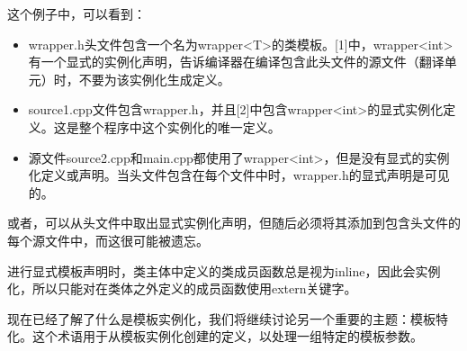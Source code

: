 这个例子中，可以看到：

\begin{itemize}
\item 
wrapper.h头文件包含一个名为wrapper<T>的类模板。[1]中，wrapper<int>有一个显式的实例化声明，告诉编译器在编译包含此头文件的源文件（翻译单元）时，不要为该实例化生成定义。

\item 
source1.cpp文件包含wrapper.h，并且[2]中包含wrapper<int>的显式实例化定义。这是整个程序中这个实例化的唯一定义。

\item 
源文件source2.cpp和main.cpp都使用了wrapper<int>，但是没有显式的实例化定义或声明。当头文件包含在每个文件中时，wrapper.h的显式声明是可见的。
\end{itemize}

或者，可以从头文件中取出显式实例化声明，但随后必须将其添加到包含头文件的每个源文件中，而这很可能被遗忘。

进行显式模板声明时，类主体中定义的类成员函数总是视为inline，因此会实例化，所以只能对在类体之外定义的成员函数使用extern关键字。

现在已经了解了什么是模板实例化，我们将继续讨论另一个重要的主题：模板特化。这个术语用于从模板实例化创建的定义，以处理一组特定的模板参数。















